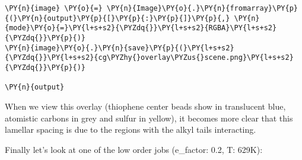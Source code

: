 \begin{tcolorbox}[breakable, size=fbox, boxrule=1pt, pad at break*=1mm,colback=cellbackground, colframe=cellborder]
\begin{Verbatim}[commandchars=\\\{\}]
\PY{n}{image} \PY{o}{=} \PY{n}{Image}\PY{o}{.}\PY{n}{fromarray}\PY{p}{(}\PY{n}{output}\PY{p}{[}\PY{p}{:}\PY{p}{]}\PY{p}{,} \PY{n}{mode}\PY{o}{=}\PY{l+s+s2}{\PYZdq{}}\PY{l+s+s2}{RGBA}\PY{l+s+s2}{\PYZdq{}}\PY{p}{)}
\PY{n}{image}\PY{o}{.}\PY{n}{save}\PY{p}{(}\PY{l+s+s2}{\PYZdq{}}\PY{l+s+s2}{cg\PYZhy{}overlay\PYZus{}scene.png}\PY{l+s+s2}{\PYZdq{}}\PY{p}{)}

\PY{n}{output}
\end{Verbatim}
\end{tcolorbox}
 
            
    
    \begin{center}
    \end{center}
    

    When we view this overlay (thiophene center beads show in translucent
blue, atomistic carbons in grey and sulfur in yellow), it becomes more
clear that this lamellar spacing is due to the regions with the alkyl
tails interacting.

Finally let's look at one of the low order jobs (e\_factor: 0.2, T:
629K):


